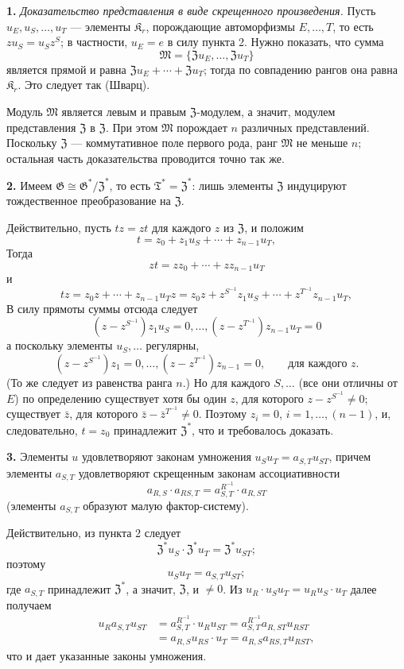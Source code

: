 \documentclass[11pt]{article}
\begin{document}
\noindent\textbf{1.} \emph{Доказательство представления в виде скрещенного произведения.} Пусть \(u_E,u_S,\ldots,u_T\) --- элементы \(\mathfrak K_r\), порождающие автоморфизмы \(E,\ldots,T\), то есть \(zu_S=u_Sz^S\); в частности, \(u_E=e\) в силу пункта 2. Нужно показать, что сумма
\[
\mathfrak M=\{\mathfrak Zu_E,\ldots,\mathfrak Zu_T\}
\]
является прямой и равна \(\mathfrak Zu_E+\cdots+\mathfrak Zu_T\); тогда по совпадению рангов она равна \(\mathfrak K_r\). Это следует так (Шварц).

Модуль \(\mathfrak M\) является левым и правым \(\mathfrak Z\)-модулем, а значит, модулем представления \(\mathfrak Z\) в \(\mathfrak Z\). При этом \(\mathfrak M\) порождает \(n\) различных представлений. Поскольку \(\mathfrak Z\) --- коммутативное поле первого рода, ранг \(\mathfrak M\) не меньше \(n\); остальная часть доказательства проводится точно так же.

\noindent\textbf{2.} Имеем \(\mathfrak G\cong\mathfrak G^*/\mathfrak Z^*\), то есть \(\mathfrak T^*=\mathfrak Z^*\): лишь элементы \(\mathfrak Z\) индуцируют тождественное преобразование на \(\mathfrak Z\).

Действительно, пусть \(tz=zt\) для каждого \(z\) из \(\mathfrak Z\), и положим
\[
t=z_0+z_1u_S+\cdots+z_{n-1}u_T,
\]
Тогда
\[
zt=zz_0+\cdots+zz_{n-1}u_T
\]
и
\[
tz=z_0z+\cdots+z_{n-1}u_Tz
=z_0z+z^{S^{-1}}z_1u_S+\cdots+z^{T^{-1}}z_{n-1}u_T,
\]
В силу прямоты суммы отсюда следует
\[
(z-z^{S^{-1}})z_1u_S=0,\ldots,
(z-z^{T^{-1}})z_{n-1}u_T=0
\]
а поскольку элементы \(u_S,\ldots\) регулярны,
\[
(z-z^{S^{-1}})z_1=0,\ldots,
(z-z^{T^{-1}})z_{n-1}=0,
\qquad\text{для каждого }z.
\]
(То же следует из равенства ранга \(n\).) Но для каждого \(S,\ldots\) (все они отличны от \(E\)) по определению существует хотя бы один \(z\), для которого \(z-z^{S^{-1}}\neq0\); существует \(\bar z\), для которого \(\bar z-\bar z^{T^{-1}}\neq0\). Поэтому \(z_i=0\), \(i=1,\ldots,(n-1)\), и, следовательно, \(t=z_0\) принадлежит \(\mathfrak Z^*\), что и требовалось доказать.

\noindent\textbf{3.} Элементы \(u\) удовлетворяют законам умножения \(u_Su_T=a_{S,T}u_{ST}\), причем элементы \(a_{S,T}\) удовлетворяют скрещенным законам ассоциативности
\[
a_{R,S}\cdot a_{RS,T}=a_{S,T}^{R^{-1}}\cdot a_{R,ST}
\]
(элементы \(a_{S,T}\) образуют малую фактор-систему).

Действительно, из пункта 2 следует
\[
\mathfrak Z^*u_S\cdot\mathfrak Z^*u_T=\mathfrak Z^*u_{ST};
\]
поэтому
\[
u_Su_T=a_{S,T}u_{ST};
\]
где \(a_{S,T}\) принадлежит \(\mathfrak Z^*\), а значит, \(\mathfrak Z\), и \(\neq0\). Из \(u_R\cdot u_Su_T=u_Ru_S\cdot u_T\) далее получаем
\[
\begin{aligned}
u_Ra_{S,T}u_{ST}
&=a_{S,T}^{R^{-1}}\cdot u_Ru_{ST}
 =a_{S,T}^{R^{-1}}a_{R,ST}u_{RST}\\
&=a_{R,S}u_{RS}\cdot u_T
 =a_{R,S}a_{RS,T}u_{RST},
\end{aligned}
\]
что и дает указанные законы умножения.
\end{document}
